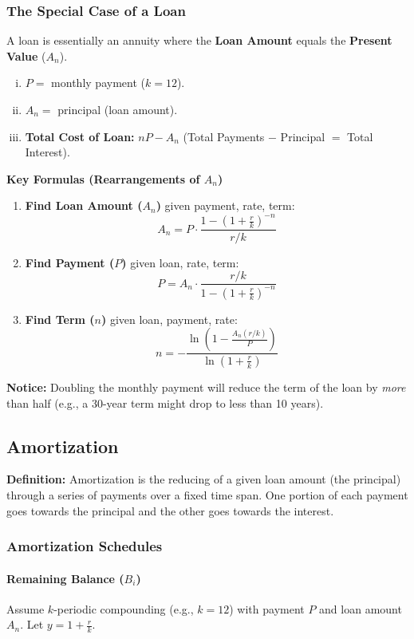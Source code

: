 \subsubsection{The Special Case of a Loan}
A loan is essentially an annuity where the \textbf{Loan Amount} equals the \textbf{Present Value} ($A_n$).
\begin{enumerate}[i.]
    \item $P = $ monthly payment ($k=12$).
    \item $A_n = $ principal (loan amount).
    \item \textbf{Total Cost of Loan:} $nP - A_n$ (Total Payments $-$ Principal $=$ Total Interest).
\end{enumerate}

\noindent \textbf{Key Formulas (Rearrangements of $A_n$)}
\begin{enumerate}
    \item \textbf{Find Loan Amount ($A_n$)} given payment, rate, term:
    \[
    A_n = P \cdot \frac{1 - (1+\frac{r}{k})^{-n}}{r/k}
    \]

    \item \textbf{Find Payment ($P$)} given loan, rate, term:
    \[
    P = A_n \cdot \frac{r/k}{1 - (1+\frac{r}{k})^{-n}}
    \]

    \item \textbf{Find Term ($n$)} given loan, payment, rate:
    \[
    n = -\frac{\ln\left(1 - \frac{A_n (r/k)}{P}\right)}{\ln\left(1+\frac{r}{k}\right)}
    \]
\end{enumerate}
\textbf{Notice:} Doubling the monthly payment will reduce the term of the loan by \textit{more} than half (e.g., a 30-year term might drop to less than 10 years).

\subsection{Amortization}
\textbf{Definition: } Amortization is the reducing of a given loan amount (the principal) through a series of payments over a fixed time span. One portion of each payment goes towards the principal and the other goes towards the interest.

\subsubsection{Amortization Schedules}
\paragraph{Remaining Balance ($B_i$)}
Assume $k$-periodic compounding (e.g., $k=12$) with payment $P$ and loan amount $A_n$. Let $y = 1 + \frac{r}{k}$.

